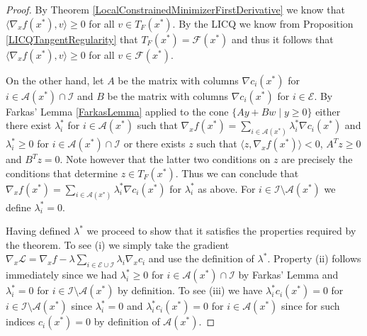 \begin{proof}
By Theorem \ref{LocalConstrainedMinimizerFirstDerivative} we know that
$\langle \nabla_x f(x^*), v \rangle \geq 0$  for all $v \in T_F(x^*)$.  By the LICQ we know from
Proposition \ref{LICQTangentRegularity} that $T_F(x^*)=\mathcal{F}(x^*)$ and thus it follows that
$\langle \nabla_x f(x^*), v \rangle \geq 0$ for all $v \in \mathcal{F}(x^*)$.  

On the other hand, let $A$ be the matrix with columns $\nabla c_i(x^*)$ for $i \in \mathcal{A}(x^*) \cap \mathcal{I}$
and $B$ be the matrix with columns $\nabla c_i(x^*)$ for $i \in \mathcal{E}$.
By Farkas' Lemma \ref{FarkasLemma} applied to the cone $\lbrace A y + B w \mid y \geq 0 \rbrace$ either
there exist $\lambda^*_i$ for $i \in \mathcal{A}(x^*)$ such that $\nabla_xf(x^*) = \sum_{i \in \mathcal{A}(x^*)} \lambda^*_i \nabla c_i(x^*)$
and $\lambda^*_i \geq 0$ for $i \in \mathcal{A}(x^*) \cap \mathcal{I}$ or there exists $z$ such that 
$\langle z, \nabla_xf(x^*) \rangle < 0$, $A^T z \geq 0$ and $B^T z = 0$.  Note however that the latter two
conditions on $z$ are precisely the conditions that determine $z \in T_F(x^*)$.  Thus we can conclude that 
$\nabla_x f(x^*) = \sum_{i \in \mathcal{A}(x^*)} \lambda^*_i \nabla c_i(x^*)$ for $\lambda^*_i$ as above.  For $i \in \mathcal{I} \setminus \mathcal{A}(x^*)$
we define $\lambda^*_i = 0$.

Having defined $\lambda^*$ we proceed to show that it satisfies the properties required by the theorem.  To see (i) we simply
take the gradient $\nabla_x \mathcal{L} = \nabla_x f - \lambda \sum_{i \in \mathcal{E} \cup \mathcal{I}} \lambda_i \nabla_x c_i$ and use the definition
of $\lambda^*$.  Property (ii) follows immediately since we had $\lambda^*_i \geq 0$ for $i \in \mathcal{A}(x^*) \cap \mathcal{I}$ by
Farkas' Lemma and $\lambda^*_i = 0$ for $i \in \mathcal{I} \setminus \mathcal{A}(x^*)$ by definition.  To see (iii) we have
$\lambda^*_i c_i(x^*) = 0$ for $i \in \mathcal{I} \setminus \mathcal{A}(x^*)$ since $\lambda^*_i = 0$ and 
$\lambda^*_i c_i(x^*) = 0$ for $i \in \mathcal{A}(x^*)$ since for such indices $c_i(x^*) = 0$ by definition of $\mathcal{A}(x^*)$.  
\end{proof}


